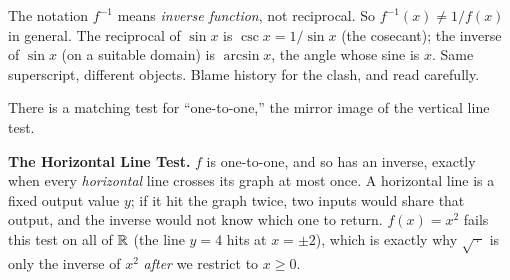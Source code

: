 \begin{trapbox}
The notation $f^{-1}$ means \emph{inverse function}, not reciprocal. So
$f^{-1}(x) \ne 1/f(x)$ in general. The reciprocal of $\sin x$ is
$\csc x = 1/\sin x$ (the cosecant); the inverse of $\sin x$ (on a suitable
domain) is $\arcsin x$, the angle whose sine is $x$. Same superscript,
different objects. Blame history for the clash, and read carefully.
\end{trapbox}
There is a matching test for ``one-to-one,'' the mirror image of the
vertical line test.
\begin{focusbox}
\textbf{The Horizontal Line Test.}\quad
$f$ is one-to-one, and so has an inverse, exactly when every \emph{horizontal}
line crosses its graph at most once. A horizontal line is a fixed output value $y$;
if it hit the graph twice, two inputs would share that output, and the inverse
would not know which one to return. $f(x)=x^2$ fails this test on all of $\mathbb{R}$ (the line $y=4$ hits at
$x=\pm 2$), which is exactly why $\sqrt{\,\cdot\,}$ is only the inverse of $x^2$
\emph{after} we restrict to $x \ge 0$.
\end{focusbox}

